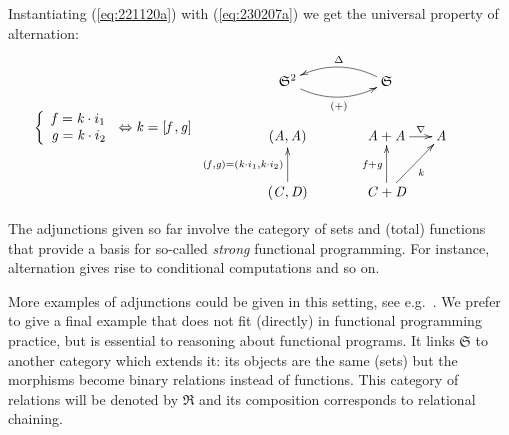 \documentclass{elsarticle}
\newcommand{\Conid}[1]{\mathit{#1}}
\newcommand{\Varid}[1]{\mathit{#1}}
\def\xarrayin#1{\begin{array}{ccccccc}#1\end{array}}
\newenvironment{lcbr}{\left\{\begin{array}{l}}{\end{array}\right.}
\def\alt#1#2{\mathopen{[}#1\hskip 1pt,#2\mathclose{]}}
\def\comp{ \mathbin{\cdot} }
\def\cat#1{{\mathfrak #1}}
\def\equiv{\Leftrightarrow}
\begin{document}
Instantiating (\ref{eq:221120a}) with (\ref{eq:230207a}) we get the universal property of alternation: 
\begin{eqnarray}
\hskip -3em
\xarrayin{
	\ensuremath{\begin{lcbr}\Varid{f}\mathrel{=}\Varid{k} \comp i_1\\\Varid{g}\mathrel{=}\Varid{k} \comp i_2\end{lcbr}}
	\equiv \ensuremath{\Varid{k}\mathrel{=}\alt{\Varid{f}}{\Varid{g}}}
}
\vcenter{\xymatrix@C3.5ex{
	\ensuremath{{\cat{S}}^{\mathrm{2}}}
		\ar@/_0.9pc/[rr]_-{\ensuremath{(\mathbin{+})}}
&&
	\ensuremath{\cat{S}}
		\ar@/_0.9pc/[ll]_-{\ensuremath{\Delta }}
\\
	\ensuremath{(\Conid{A},\Conid{A})}
&&
	\ensuremath{\Conid{A}\mathbin{+}\Conid{A}}
	\ar[r]^-{\ensuremath{\nabla }}
&
	\ensuremath{\Conid{A}}
\\
	\ensuremath{(\Conid{C},\Conid{D})}
	\ar[u]^{\ensuremath{(\Varid{f},\Varid{g})\mathrel{=}(\Varid{k} \comp i_1,\Varid{k} \comp i_2)}}
&&
	\ensuremath{\Conid{C}\mathbin{+}\Conid{D}}
	\ar[u]^{\ensuremath{\Varid{f}\mathbin{+}\Varid{g}}}
	\ar[ru]_{\ensuremath{\Varid{k}}}
}}
	\label{eq:200206a}
\end{eqnarray}

The adjunctions given so far involve the category of sets and (total) functions that
provide a basis for so-called \emph{strong} \cite{Tu95} functional programming.
For instance, alternation gives rise to conditional computations \cite{BM97}
and so on.

More examples of adjunctions could
be given in this setting, see e.g.\ \cite{Hi13}.
We prefer to give a final example that does not fit (directly) in functional
programming practice, but is essential to reasoning about functional programs.
It links \ensuremath{\cat{S}} to another category which extends it: its objects are the same
(sets) but the morphisms become binary relations instead of functions. This
category of relations will be denoted by \ensuremath{\cat{R}} and its composition corresponds to
relational chaining.
\end{document}
